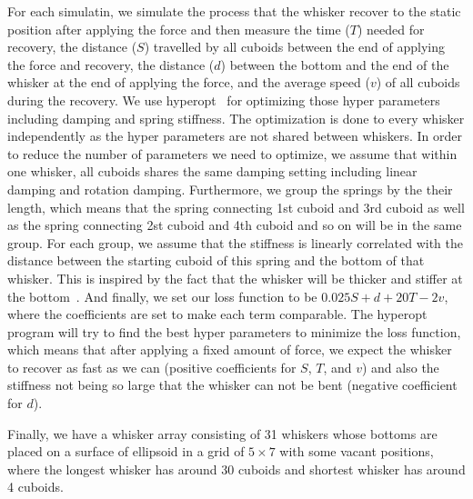 For each simulatin, we simulate the process that the whisker recover to the static position after applying the force and then measure the time ($T$) needed for recovery, the distance ($S$) travelled by all cuboids between the end of applying the force and recovery, the distance ($d$) between the bottom and the end of the whisker at the end of applying the force, and the average speed ($v$) of all cuboids during the recovery.
We use hyperopt~\cite{bergstra2013hyperopt} for optimizing those hyper parameters including damping and spring stiffness. The optimization is done to every whisker independently as the hyper parameters are not shared between whiskers.
In order to reduce the number of parameters we need to optimize, we assume that within one whisker, all cuboids shares the same damping setting including linear damping and rotation damping.
Furthermore, we group the springs by the their length, which means that the spring connecting 1st cuboid and 3rd cuboid as well as the spring connecting 2st cuboid and 4th cuboid and so on will be in the same group.
For each group, we assume that the stiffness is linearly correlated with the distance between the starting cuboid of this spring and the bottom of that whisker.
This is inspired by the fact that the whisker will be thicker and stiffer at the bottom~\cite{Hartmann:2015}.
And finally, we set our loss function to be $0.025S + d + 20T - 2v$, where the coefficients are set to make each term comparable.
The hyperopt program will try to find the best hyper parameters to minimize the loss function, which means that after applying a fixed amount of force, we expect the whisker to recover as fast as we can (positive coefficients for $S$, $T$, and $v$) and also the stiffness not being so large that the whisker can not be bent (negative coefficient for $d$).

Finally, we have a whisker array consisting of 31 whiskers whose bottoms are placed on a surface of ellipsoid in a grid of $5\times7$ with some vacant positions, where the longest whisker has around 30 cuboids and shortest whisker has around 4 cuboids. 
